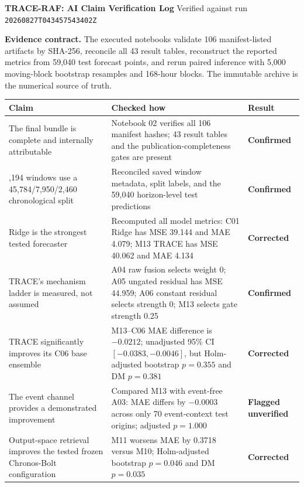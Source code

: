 \documentclass{article}
\newcommand{\C}{\cellcolor{confirmed}\textbf{Confirmed}}
\newcommand{\R}{\cellcolor{corrected}\textbf{Corrected}}
\newcommand{\F}{\cellcolor{flagged}\textbf{Flagged unverified}}
\begin{document}
{\Large\bfseries TRACE-RAF: AI Claim Verification Log}\hfill
{\small Verified against run \texttt{20260827T043457543402Z}}
\par\fontsize{8.4}{9.7}\selectfont

\vspace{2pt}
\textbf{Evidence contract.} The executed notebooks validate 106 manifest-listed
artifacts by SHA-256, reconcile all 43 result tables, reconstruct the reported
metrics from 59,040 test forecast points, and rerun paired inference with 5,000
moving-block bootstrap resamples and 168-hour blocks. The immutable archive
is the numerical source of truth.

\vspace{2pt}
\begin{tabularx}{\textwidth}{>{\raggedright\arraybackslash}p{}
>{\raggedright\arraybackslash}X
>{\raggedright\arraybackslash}p{}}
\toprule
\textbf{Claim} & \textbf{Checked how} & \textbf{Result} \\
\midrule
The final bundle is complete and internally attributable & Notebook 02 verifies all 106 manifest hashes; 43 result tables and the publication-completeness gates are present & \C \\
56,194 windows use a 45,784/7,950/2,460 chronological split & Reconciled saved window metadata, split labels, and the 59,040 horizon-level test predictions & \C \\
Ridge is the strongest tested forecaster & Recomputed all model metrics: C01 Ridge has MSE 39.144 and MAE 4.079; M13 TRACE has MSE 40.062 and MAE 4.134 & \R \\
TRACE's mechanism ladder is measured, not assumed & A04 raw fusion selects weight 0; A05 ungated residual has MSE 44.959; A06 constant residual selects strength 0; M13 selects gate strength 0.25 & \C \\
TRACE significantly improves its C06 base ensemble & M13--C06 MAE difference is $-0.0212$; unadjusted 95\% CI $[-0.0383,-0.0046]$, but Holm-adjusted bootstrap $p=0.355$ and DM $p=0.381$ & \R \\
The event channel provides a demonstrated improvement & Compared M13 with event-free A03: MAE differs by $-0.0003$ across only 70 event-context test origins; adjusted $p=1.000$ & \F \\
Output-space retrieval improves the tested frozen Chronos-Bolt configuration & M11 worsens MAE by 0.3718 versus M10; Holm-adjusted bootstrap $p=0.046$ and DM $p=0.035$ & \R \\

\end{tabularx}
\end{document}
